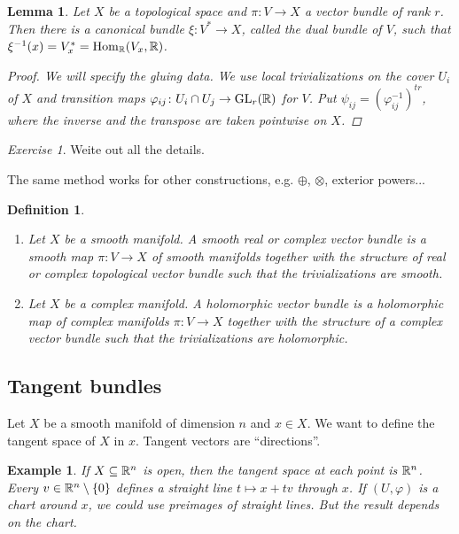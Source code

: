 \documentclass[A4paper, british, reqno]{amsart}
\theoremstyle{darkgreentheorem}
\newtheorem{lm}[thm]{Lemma}
\theoremstyle{darkbluedefinition}
\newtheorem{defn}[thm]{Definition}
\theoremstyle{darkredexample}
\newtheorem{exa}[thm]{Example}
\theoremstyle{remark}
\newtheorem{exe}[thm]{Exercise}
\DeclareMathOperator{\Hom}{Hom}
\DeclareMathOperator{\GL}{GL}
\newcommand{\1}{\mathbbm{1}}
\newcommand{\ot}{\otimes}
\newcommand{\op}{\oplus}
\newcommand{\sub}{\subseteq}
\begin{document}
\begin{lm}
    Let $X$ be a topological space and $\pi\colon V\to X$ a vector bundle of rank $r$.
    Then there is a canonical bundle $\xi \colon V^{*}\to X$, called the \textit{dual bundle} of $V$, such that $\xi^{-1}(x)=V_{x}^{*}=\Hom_{\R}(V_{x},\R)$.
    \begin{proof}
	We will specify the gluing data.
	We use local trivializations on the cover $U_{i}$ of $X$ and transition maps $\varphi_{ij}\colon U_{i}\cap U_{j}\to \GL_{r}(\R)$ for $V$.
	Put $\psi_{ij}=(\varphi_{ij}^{-1})^{tr}$, where the inverse and the transpose are taken pointwise on $X$.
    \end{proof}
\end{lm}

\begin{exe}
    Weite out all the details.
\end{exe}

The same method works for other constructions, e.g. $\op$, $\ot$, exterior powers...

\begin{defn}
    \begin{enumerate}[label=\roman*)]
	\item Let $X$ be a smooth manifold.
	    A smooth real or complex vector bundle is a smooth map $\pi\colon V\to X$ of smooth manifolds together with the structure of real or complex topological vector bundle such that the trivializations are smooth.
	\item Let $X$ be a complex manifold.
	    A holomorphic vector bundle is a holomorphic map of complex manifolds $\pi \colon V\to X$ together with the structure of a complex vector bundle such that the trivializations are holomorphic.
    \end{enumerate}
\end{defn}

\subsection{Tangent bundles}

Let $X$ be a smooth manifold of dimension $n$ and $x\in X$.
We want to define the tangent space of $X$ in $x$.
Tangent vectors are ``directions''.

\begin{exa}
    If $X\sub \R^{n}$ is open, then the tangent space at each point is $\mathbb{R}^{n}$.
    Every $v\in \mathbb{R}^{n}\setminus \{ 0\}$ defines a straight line $t\mapsto x+tv$ through $x$.
    If $(U,\varphi)$ is a chart around $x$, we could use preimages of straight lines.
    But the result depends on the chart.
\end{exa}
\end{document}

